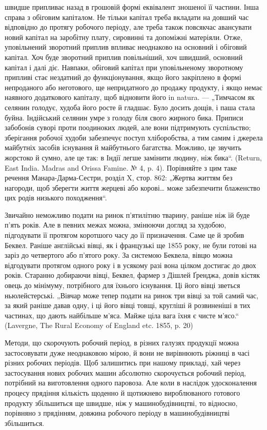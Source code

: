\parcont{}  %
швидше припливає назад в грошовій формі еквівалент зношеної її частини.
Інша справа з обіговим капіталом. Не тільки капітал треба вкладати на
довший час відповідно до протягу робочого періоду, але треба також
повсякчас авансувати новий капітал на заробітну плату, сировинні та
допоміжні матеріяли. Отже, уповільнений зворотний приплив впливає
неоднаково на основний і обіговий капітал. Хоч буде зворотний приплив
повільніший, хоч швидший, основний капітал і далі діє. Навпаки, обіговий
капітал при уповільненому зворотному припливі стає нездатний до функціонування,
якщо його закріплено в формі непроданого або неготового,
ще непридатного до продажу продукту, і якщо немає наявного додаткового
капіталу, щоб відновити його in natura. — „Тимчасом як селянин
голодує, худоба його росте й гладшає. Було досить дощів, і паша стала
буйна. Індійський селянин умре з голоду біля свого жирного бика. Приписи
забобонів суворі проти поодиноких людей, але вони підтримують
суспільство; зберігання робочої худоби забезпечує поступ хліборобства,
а тим самим і джерела майбутніх засобів існування й майбутнього багатства.
Можливо, це звучить жорстоко й сумно, але це так: в Індії легше
замінити людину, ніж бика“. (Return, East India. Madras and Orissa
Famine. № 4, p. 4). Порівняйте з цим таке речення Манара-Дарма-Сестри,
розділ X, стор. 862: „Жертва життям без нагороди, щоб зберегти
життя жерцеві або корові\dots{} може забезпечити блаженство цих
родів низького походження“.

Звичайно неможливо подати на ринок п’ятилітню тварину, раніше
ніж їй буде п’ять років. Але в певних межах можна, змінюючи догляд
за худобою, підгодувати її протягом коротшого часу до її призначення.
Саме це й зробив Беквел. Раніше англійські вівці, як і французькі ще
1855 року, не були готові на заріз до четвертого або п’ятого року. За
системою Беквела, вівцю можна відгодувати протягом одного року і в
усякому разі вона цілком достигає до двох років. Старанно добираючи вівці,
Беквел, фармер з Дішлей Ґренджа, довів кістяк овець до мінімуму, потрібного
для їхнього існування. Ці його вівці зветься ньюлейстерські.
„Вівчар може тепер подати на ринок три вівці за той самий час, за який
раніше давав одну, і ці його вівці товщі, кругліші й розвиненіші
в тих частинах, що дають найбільше м’яса. Майже ціла вага їхня є чисте
м’ясо.“ (Lavergne, The Rural Economy of England etc. 1855, p. 20)

Методи, що скорочують робочий період, в різних галузях продукції
можна застосовувати дуже неоднаковою мірою, й вони не вирівнюють
ріжниці в часі різних робочих періодів. Щоб залишитись при нашому
прикладі, хай через застосування нових робочих машин абсолютно скорочується
робочий період, потрібний на виготовлення одного паровоза.
Але коли в наслідок удосконалення процесу прядіння кількість щоденно
й щотижнево вироблюваного готового продукту збільшиться ще швидше,
ніж у машинобудівництві, то відносно, порівняно з прядінням, довжина
робочого періоду в машинобудівництві збільшиться.
